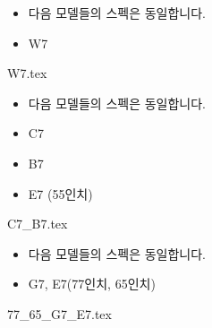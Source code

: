 \documentclass{beamer}
\begin{document}






\begin{frame}[t]{}
\tableofcontents
\huge
\begin{itemize}
\large \item 다음 모델들의 스펙은 동일합니다.
\huge \item W7
\end{itemize}
\end{frame}
{W7.tex}				%


\begin{frame}[t]{}
\tableofcontents
\huge
\begin{itemize}
\large \item 다음 모델들의 스펙은 동일합니다.
\huge \item C7
\huge \item B7
\huge \item E7 (55인치)
\end{itemize}
\end{frame}
{C7_B7.tex}	%



\begin{frame}[t]{}
\tableofcontents
\huge
\begin{itemize}
\large \item 다음 모델들의 스펙은 동일합니다.
\huge \item G7, E7(77인치, 65인치)
\end{itemize}
\end{frame}
{77_65_G7_E7.tex}			%
\end{document}
